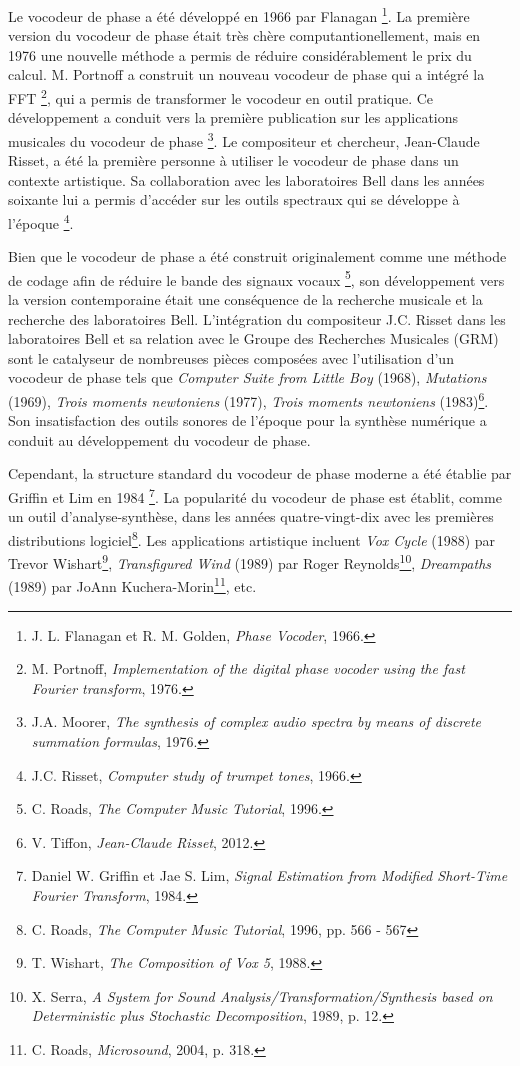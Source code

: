 Le vocodeur de phase a été développé en 1966 par Flanagan \footnote{J. L. Flanagan et R. M. Golden, \textit{Phase Vocoder}, 1966. \nocite{flanagan}}. La première version du vocodeur de phase était très chère computantionellement, mais en 1976 une nouvelle méthode a permis de réduire considérablement le prix du calcul. M. Portnoff a construit un nouveau vocodeur de phase qui a intégré la FFT \footnote{M. Portnoff, \textit{Implementation of the digital phase vocoder using the fast Fourier transform}, 1976. \nocite{portnoff1976implementation}}, qui a permis de transformer le vocodeur en outil pratique. Ce développement a conduit vers la première publication sur les applications musicales du vocodeur de phase \footnote{J.A. Moorer, \textit{The synthesis of complex audio spectra by means of discrete summation formulas}, 1976. \nocite{moorer1976synthesis}}. Le compositeur et chercheur, Jean-Claude Risset, a été la première personne à utiliser le vocodeur de phase dans un contexte artistique. Sa collaboration avec les laboratoires Bell dans les années soixante lui a permis d’accéder sur les outils spectraux qui se développe à l'époque \footnote{J.C. Risset, \textit{Computer study of trumpet tones}, 1966. \nocite{risset1966computer}}. 

Bien que le vocodeur de phase a été construit originalement comme une méthode de codage afin de réduire le bande des signaux vocaux \footnote{C. Roads, \textit{The Computer Music Tutorial}, 1996. \nocite{Roads1996}}, son développement vers la version contemporaine était une conséquence de la recherche musicale et la recherche des laboratoires Bell. L’intégration du compositeur J.C. Risset dans les laboratoires Bell et sa relation avec le Groupe des Recherches Musicales (GRM) sont le catalyseur de nombreuses pièces composées avec l'utilisation d'un vocodeur de phase tels que \textit{Computer Suite from Little Boy} (1968), \textit{Mutations} (1969), \textit{Trois moments newtoniens} (1977), \textit{Trois moments newtoniens} (1983)\footnote{V. Tiffon, \textit{Jean-Claude Risset}, 2012. \nocite{RissetParcours}}. Son insatisfaction des outils sonores de l’époque pour la synthèse numérique a conduit au développement du vocodeur de phase.

Cependant, la structure standard du vocodeur de phase moderne a été établie par Griffin et Lim en 1984 \footnote{Daniel W. Griffin et Jae S. Lim, \textit{Signal Estimation from Modified Short-Time Fourier Transform}, 1984. \nocite{GrL84}}. La popularité du vocodeur de phase est établit, comme un outil d'analyse-synthèse, dans les années quatre-vingt-dix avec les premières distributions logiciel\footnote{C. Roads, \textit{The Computer Music Tutorial}, 1996, pp. 566 - 567 \nocite{Roads1996}}. Les applications artistique incluent \textit{Vox Cycle} (1988) par Trevor Wishart\footnote{T. Wishart, \textit{The Composition of Vox 5}, 1988. \nocite{wishart1988composition}}, \textit{Transfigured Wind} (1989) par Roger Reynolds\footnote{X. Serra, \textit{A System for Sound Analysis/Transformation/Synthesis based on Deterministic plus Stochastic Decomposition}, 1989, p. 12. \nocite{serra1989system}}, \textit{Dreampaths} (1989) par JoAnn Kuchera-Morin\footnote{C. Roads, \textit{Microsound}, 2004, p. 318. \nocite{roads2004microsound}}, etc. 

